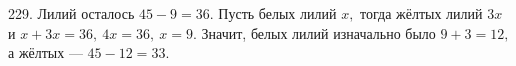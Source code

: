 229. Лилий осталось $45-9=36.$ Пусть белых лилий $x,$ тогда жёлтых лилий $3x$ и $x+3x=36,\ 4x=36,\ x=9.$ Значит, белых лилий изначально было $9+3=12,$ а жёлтых --- $45-12=33.$\\
